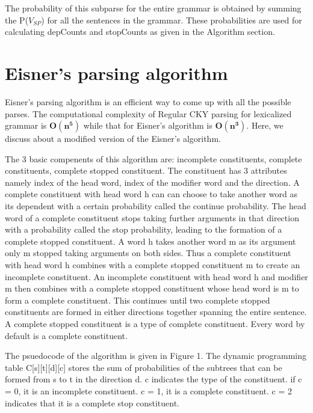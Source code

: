 \documentclass{article}
\begin{document}
The probability of this subparse for the entire grammar is obtained by summing the P($V_{SP}$) for all the sentences in the grammar. These probabilities are used for calculating depCounts and stopCounts as given in the Algorithm section.

\section{Eisner's parsing algorithm}

Eisner's parsing algorithm is an efficient way to come up with all the possible parses. The computational complexity of Regular CKY parsing for lexicalized grammar is $\bm{O(n^5)}$ while that for Eisner's algorithm is $\bm{O(n^3)}$. Here, we discuss about a modified version of the Eisner's algorithm.

The 3 basic compenents of this algorithm are: incomplete constituents, complete constituents, complete stopped constituent. The constituent has  3 attributes namely index of the head word, index of the modifier word and the direction. A complete constituent with head word h can can choose to take another word as its dependent with a certain probability called the continue probability. The head word of a complete constituent stops taking further arguments in that direction with a probability called the stop probability, leading to the formation of a complete stopped constituent. A word h takes another word m as its argument only m stopped taking arguments on both sides. Thus a complete constituent with head word h combines with a complete stopped constituent m to create an incomplete constituent. An incomplete constituent with head word h and modifier m then combines with a complete stopped constituent whose head word is m to form a complete constituent. This continues until two complete stopped constituents are formed in either directions together spanning the entire sentence. A complete stopped constituent is a type of complete constituent. Every word by default is a complete constituent.

The psuedocode of the algorithm is given in Figure 1. The dynamic programming table C[s][t][d][c] stores the sum of probabilities of the subtrees that can be formed from s to t in the direction d. c indicates the type of the constituent. if c = 0, it is an incomplete constituent. c = 1, it is a complete constituent. c = 2 indicates that it is a complete stop constituent.
\end{document}
